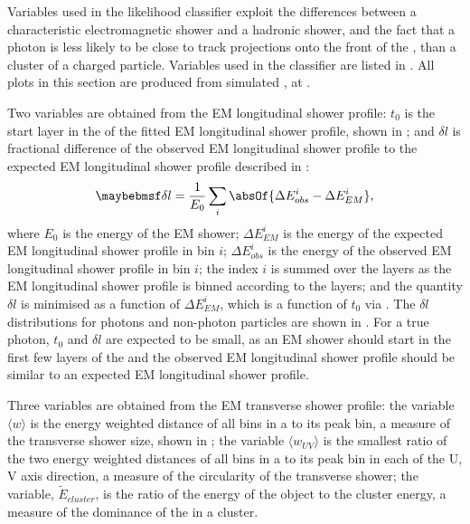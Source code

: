 Variables used in the likelihood classifier exploit the differences between a characteristic electromagnetic shower and a hadronic shower, and the fact that a photon is less likely to be close to track projections onto the front of the \ECAL, than a cluster of a charged particle. Variables used in the classifier are listed in . All plots in this section are produced from  simulated \eeZuds, at .

Two variables are obtained from the EM longitudinal shower profile: $t_0$ is the start layer in the \ECAL of the fitted EM longitudinal shower profile, shown in ; and $\delta{l}$ is fractional difference of the observed EM longitudinal shower profile to the expected EM longitudinal shower profile described in :
\begin{equation}
\delta l = \frac{1}{E_0}\sum_{i}^{}\absOf{\Delta E_{obs}^i - \Delta E_{EM}^i },
\end{equation}
where $E_0$ is the energy of the EM shower; $\Delta E_{EM}^i$ is the energy of the expected EM longitudinal shower profile in bin $i$;  $\Delta E_{obs}^i$ is the energy of the observed EM longitudinal shower profile in bin $i$; the index $i$ is summed over the \ECAL layers as the EM longitudinal shower profile is binned according to the \ECAL layers; and the quantity $\delta l$ is minimised as a function of $\Delta E_{EM}^i$, which is a  function of $t_0$ via  . The $\delta l$ distributions for photons and non-photon particles are shown in . For a true photon, $t_0$  and $\delta l $ are expected to be small, as an EM shower should start in the first few layers of the \ECAL and the observed EM longitudinal shower profile should be similar to an expected EM longitudinal shower profile.

Three variables are obtained from the EM transverse  shower profile: the variable $\langle{w}\rangle$ is the energy weighted \rms distance of all bins in a \ShowerPeak to its peak bin, a measure of the transverse shower size, shown in ; the variable ${\langle{w_{UV}}\rangle}$ is the smallest ratio of the two energy weighted \rms distances of all bins in a \ShowerPeak to its peak bin in each of the U, V axis direction, a measure of the circularity of the transverse shower; the variable, $\tilde{E}_{cluster}$, is the  ratio of the energy of the \ShowerPeak object to the cluster energy, a measure of the dominance of the \ShowerPeak in a cluster.

